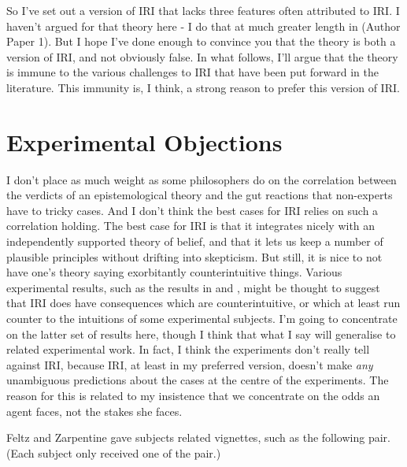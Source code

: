 \documentclass[oneside]{book}
\begin{document}
So I've set out a version of IRI that lacks three features often attributed to IRI. I haven't argued for that theory here - I do that at much greater length in (Author Paper 1). But I hope I've done enough to convince you that the theory is  both a version of IRI, and not obviously false. In what follows, I'll argue that the theory is immune to the various challenges to IRI that have been put forward in the literature. This immunity is, I think, a strong reason to prefer this version of IRI.

\section{Experimental Objections} \label{sect:xphi}
I don't place as much weight as some philosophers do on the correlation between the verdicts of an epistemological theory and the gut reactions that non-experts have to tricky cases. And I don't think the best cases for IRI relies on such a correlation holding. The best case for IRI is that it integrates nicely with an independently supported theory of belief, and that it lets us keep a number of plausible principles without drifting into skepticism. But still, it is nice to not have one's theory saying exorbitantly counterintuitive things. Various experimental results, such as the results in \cite{May2010} and \cite{FeltzZarpentine2010}, might be thought to suggest that IRI does have consequences which are counterintuitive, or which at least run counter to the intuitions of some experimental subjects. I'm going to concentrate on the latter set of results here, though I think that what I say will generalise to related experimental work. In fact, I think the experiments don't really tell against IRI, because IRI, at least in my preferred version, doesn't make \textit{any} unambiguous predictions about the cases at the centre of the experiments. The reason for this is related to my insistence that we concentrate on the odds an agent faces, not the stakes she faces.

Feltz and Zarpentine gave subjects related vignettes, such as the following pair. (Each subject only received one of the pair.)
\end{document}
